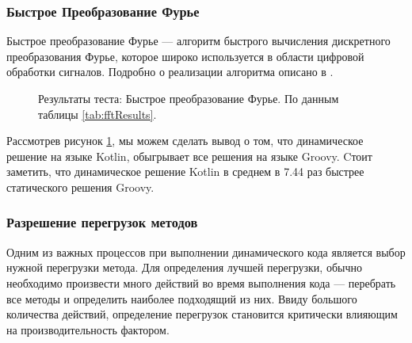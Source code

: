 \subsubsection{Быстрое Преобразование Фурье}

Быстрое преобразование Фурье --- алгоритм быстрого вычисления дискретного преобразования Фурье, которое широко используется в области цифровой обработки сигналов. Подробно о реализации алгоритма описано в \cite{algo:dasgypta2014algo}.



\begin{figure}
\caption{\label{graph:fftResults}Результаты теста: Быстрое преобразование Фурье. По данным таблицы \ref{tab:fftResults}.}
\end{figure}


Рассмотрев рисунок \ref{graph:fftResults}, мы можем сделать вывод о том, что динамическое решение на языке Kotlin, обыгрывает все решения на языке Groovy. %
Cтоит заметить, что динамическое решение Kotlin в среднем в 7.44 раз быстрее статического решения Groovy.


\subsubsection{Разрешение перегрузок методов}
\label{sec:benchOverloadsResolv}

Одним из важных процессов при выполнении динамического кода является выбор нужной перегрузки метода. Для определения лучшей перегрузки, обычно необходимо произвести много действий во время выполнения кода --- перебрать все методы и определить наиболее подходящий из них. Ввиду большого количества действий, определение перегрузок становится критически влияющим на производительность фактором.

